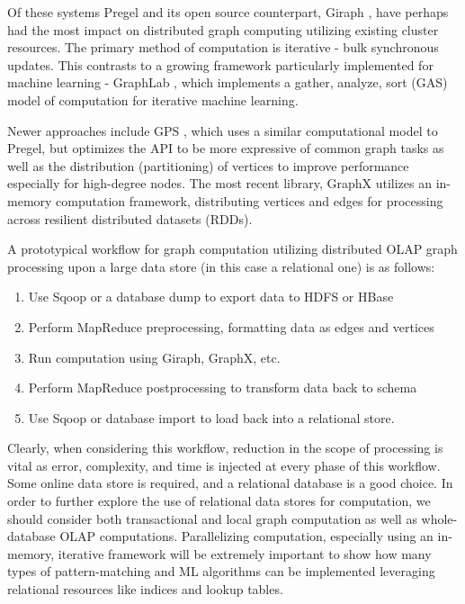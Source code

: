 \documentclass[11pt,letterpaper]{article}
\begin{document}
Of these systems Pregel \cite{malewicz_pregel:_2010} and its open source counterpart,  Giraph \cite{ching_apache_2014}, have perhaps had the most impact on distributed graph computing utilizing existing cluster resources. The primary method of computation is iterative - bulk synchronous updates. This contrasts to a growing framework particularly implemented for machine learning - GraphLab \cite{low_graphlab:_2011}, which implements a gather, analyze, sort (GAS) model of computation for iterative machine learning.

Newer approaches include GPS \cite{salihoglu_gps:_2013}, which uses a similar computational model to Pregel, but optimizes the API to be more expressive of common graph tasks as well as the distribution (partitioning) of vertices to improve performance especially for high-degree nodes. The most recent library, GraphX \cite{_graphx_2015} utilizes an in-memory computation framework, distributing vertices and edges for processing across resilient distributed datasets (RDDs).

A prototypical workflow for graph computation utilizing distributed OLAP graph processing upon a large data store (in this case a relational one) is as follows:

\begin{enumerate}
	\item Use Sqoop or a database dump to export data to HDFS or HBase
	\item Perform MapReduce preprocessing, formatting data as edges and vertices
	\item Run computation using Giraph, GraphX, etc.
	\item Perform MapReduce postprocessing to transform data back to schema
	\item Use Sqoop or database import to load back into a relational store.
\end{enumerate}

Clearly, when considering this workflow, reduction in the scope of processing is vital as error, complexity, and time is injected at every phase of this workflow. Some online data store is required, and a relational database is a good choice. In order to further explore the use of relational data stores for computation, we should consider both transactional and local graph computation as well as whole-database OLAP computations. Parallelizing computation, especially using an in-memory, iterative framework will be extremely important to show how many types of pattern-matching and ML algorithms can be implemented leveraging relational resources like indices and lookup tables.
\end{document}
